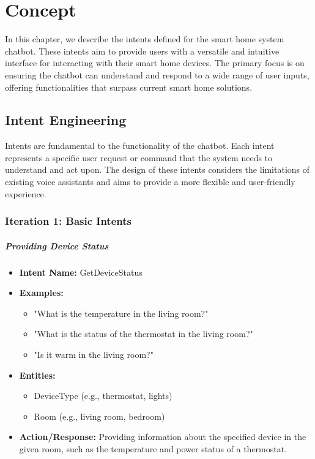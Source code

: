 
\chapter{Concept}
\label{chap:concept}

In this chapter, we describe the intents defined for the smart home system chatbot. These intents aim to provide users with a versatile and intuitive interface for interacting with their smart home devices. 
The primary focus is on ensuring the chatbot can understand and respond to a wide range of user inputs, offering functionalities that surpass current smart home solutions.

\section{Intent Engineering}

Intents are fundamental to the functionality of the chatbot. Each intent represents a specific user request or command that the system needs to understand and act upon. The design of these intents considers the limitations of existing voice assistants and aims to provide a more flexible and user-friendly experience.

\subsection{Iteration 1: Basic Intents}

\paragraph{Providing Device Status}

\begin{itemize}
    \item \textbf{Intent Name:} GetDeviceStatus
    \item \textbf{Examples:}
    \begin{itemize}
        \item "What is the temperature in the living room?"
        \item "What is the status of the thermostat in the living room?"
        \item "Is it warm in the living room?"
    \end{itemize}
    \item \textbf{Entities:}
    \begin{itemize}
        \item DeviceType (e.g., thermostat, lights)
        \item Room (e.g., living room, bedroom)
    \end{itemize}
    \item \textbf{Action/Response:} Providing information about the specified device in the given room, such as the temperature and power status of a thermostat.
\end{itemize}

